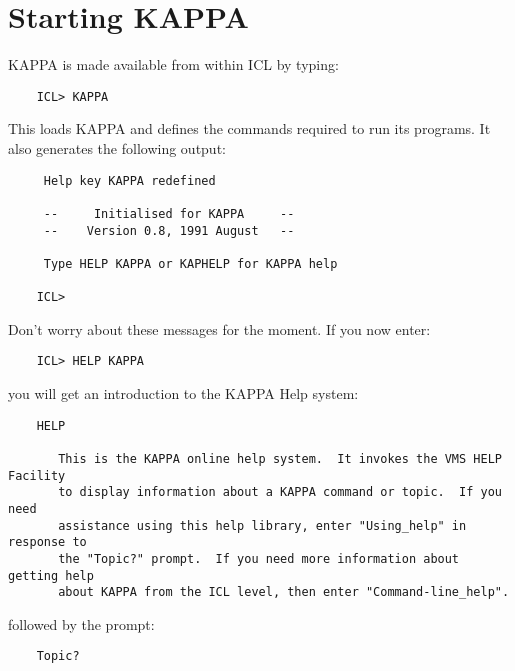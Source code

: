 \section {Starting KAPPA}
\label{S_startkap}

KAPPA is made available from within ICL by typing:

\begin{small}
\begin{verbatim}
    ICL> KAPPA
\end{verbatim}
\end{small}

This loads KAPPA and defines the commands required to run its programs.
It also generates the following output:

\begin{small}
\begin{verbatim}
     Help key KAPPA redefined

     --     Initialised for KAPPA     --
     --    Version 0.8, 1991 August   --

     Type HELP KAPPA or KAPHELP for KAPPA help

    ICL>
\end{verbatim}
\end{small}

Don't worry about these messages for the moment.
If you now enter:

\begin{small}
\begin{verbatim}
    ICL> HELP KAPPA
\end{verbatim}
\end{small}

you will get an
introduction to the KAPPA Help system:

\begin{small}
\begin{verbatim}
    HELP

       This is the KAPPA online help system.  It invokes the VMS HELP Facility
       to display information about a KAPPA command or topic.  If you need
       assistance using this help library, enter "Using_help" in response to
       the "Topic?" prompt.  If you need more information about getting help
       about KAPPA from the ICL level, then enter "Command-line_help".
\end{verbatim}
\end{small}

followed by the prompt:

\begin{small}
\begin{verbatim}
    Topic?
\end{verbatim}
\end{small}

